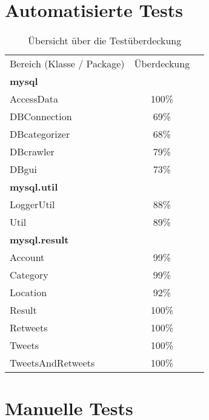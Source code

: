 \section{Automatisierte Tests}

\begin{table}[h]
\begin{tabular} {lcr}
Bereich (Klasse / Package) & Überdeckung \\
		\textbf{mysql} &  \\
		AccessData & 100\% \\
		DBConnection & 69\% \\
		DBcategorizer & 68\% \\
		DBcrawler & 79\% \\
		DBgui & 73\% \\
		\textbf{mysql.util} &  \\
		LoggerUtil & 88\% \\
		Util & 89\% \\
		\textbf{mysql.result} &  \\
		Account & 99\% \\
		Category & 99\% \\
		Location & 92\% \\
		Result & 100\% \\
		Retweets & 100\% \\
		Tweets & 100\% \\
		TweetsAndRetweets & 100\% \\
	\end{tabular}
	\caption{Übersicht über die Testüberdeckung}
\end{table}

\section{Manuelle Tests}